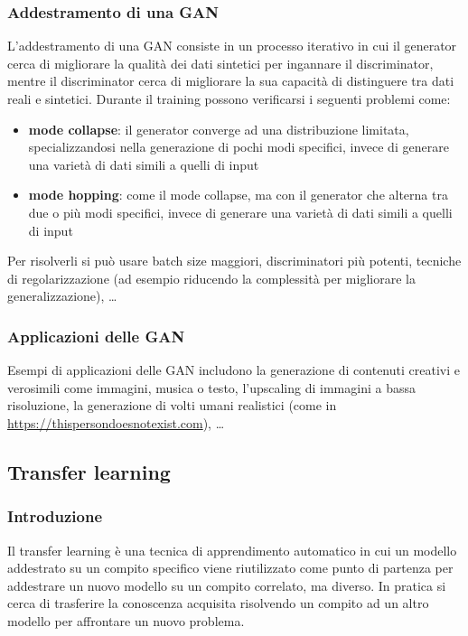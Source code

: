 \subsubsection*{Addestramento di una GAN}
L'addestramento di una GAN consiste in un processo iterativo in cui il generator cerca di migliorare la qualità dei dati
sintetici per ingannare il discriminator, mentre il discriminator cerca di migliorare la sua capacità di distinguere tra dati
reali e sintetici. Durante il training possono verificarsi i seguenti problemi come:
\begin{itemize}
	\item \textbf{mode collapse}: il generator converge ad una distribuzione limitata, specializzandosi nella generazione di
	pochi modi specifici, invece di generare una varietà di dati simili a quelli di input
	\item \textbf{mode hopping}: come il mode collapse, ma con il generator che alterna tra due o più modi specifici, invece
	di generare una varietà di dati simili a quelli di input
\end{itemize}
Per risolverli si può usare batch size maggiori, discriminatori più potenti, tecniche di regolarizzazione (ad esempio
riducendo la complessità per migliorare la generalizzazione), \dots

\subsubsection*{Applicazioni delle GAN}
Esempi di applicazioni delle GAN includono la generazione di contenuti creativi e verosimili come immagini, musica o testo,
l'upscaling di immagini a bassa risoluzione, la generazione di volti umani realistici (come in
\href{https://thispersondoesnotexist.com}{https://thispersondoesnotexist.com}), \dots

\newpage

\subsection{Transfer learning}
\subsubsection*{Introduzione}
Il transfer learning è una tecnica di apprendimento automatico in cui un modello addestrato su un compito specifico viene
riutilizzato come punto di partenza per addestrare un nuovo modello su un compito correlato, ma diverso. In pratica si cerca
di trasferire la conoscenza acquisita risolvendo un compito ad un altro modello per affrontare un nuovo problema.

